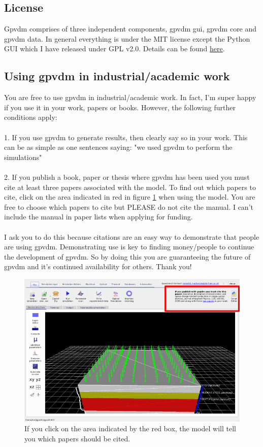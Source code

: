 \pagebreak
\subsection{License}
Gpvdm comprises of three independent components, gpvdm gui, gpvdm core and gpvdm data.  In general everything is under the MIT license except the Python GUI which I have released under GPL v2.0. Details can be found \href{https://github.com/roderickmackenzie/gpvdm/blob/main/LICENSE.md}{here}.

\subsection{Using gpvdm in industrial/academic work}
\label{sec:using_gvpdm}
You are free to use gpvdm in industrial/academic work. In fact, I'm super happy if you use it in your work, papers or books. However, the following further conditions apply:\\\\
1. If you use gpvdm to generate results, then clearly say so in your work. This can be as simple as one sentences saying: "we used gpvdm to perform the simulations" \\\\
2. If you publish a book, paper or thesis where gpvdm has been used you must cite at least three papers associated with the model.  To find out which papers to cite, click on the area indicated in red in figure \ref{fig:cite_me} when using the model.   You are free to choose which papers to cite but PLEASE do not cite the manual. I can't include the manual in paper lists when applying for funding.\\
\\
I ask you to do this because citations are an easy way to demonstrate that people are using gpvdm. Demonstrating use is key to finding money/people to continue the development of gpvdm.  So by doing this you are guaranteeing the future of gpvdm and it's continued availability for others.  Thank you!

\begin{figure}[H]
\centering
\includegraphics[width=\textwidth]{./images/cite_me2.png}
\caption{If you click on the area indicated by the red box, the model will tell you which papers should be cited.}
\label{fig:cite_me}
\end{figure}

